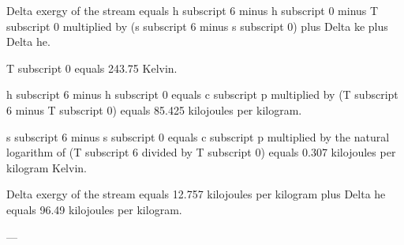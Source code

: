 Delta exergy of the stream equals h subscript 6 minus h subscript 0 minus T subscript 0 multiplied by (s subscript 6 minus s subscript 0) plus Delta ke plus Delta he.  

T subscript 0 equals 243.75 Kelvin.  

h subscript 6 minus h subscript 0 equals c subscript p multiplied by (T subscript 6 minus T subscript 0) equals 85.425 kilojoules per kilogram.  

s subscript 6 minus s subscript 0 equals c subscript p multiplied by the natural logarithm of (T subscript 6 divided by T subscript 0) equals 0.307 kilojoules per kilogram Kelvin.  

Delta exergy of the stream equals 12.757 kilojoules per kilogram plus Delta he equals 96.49 kilojoules per kilogram.  

---